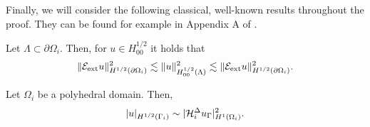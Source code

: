 Finally, we will consider the following classical, well-known results throughout the proof. They can be found for example in Appendix A of \cite{dd-book}.

\begin{lemma}
    Let $\Lambda \subset \partial\Omega_i$. Then, for $u \in H^{1/2}_{00}$ it holds that 
    \[\|\mathcal{E}_{\text{ext}}u\|^2_{H^{1/2}(\partial \Omega_i)} \lesssim \|u\|^2_{H^{1/2}_{00}(\Lambda)} \lesssim \|\mathcal{E}_{\text{ext}}u\|^2_{H^{1/2}(\partial\Omega_i)}.\]
\end{lemma}

\begin{theorem} Let $\Omega_i$ be a polyhedral domain. Then,
\[|u|_{H^{1/2}(\Gamma_i)} \sim |\mathcal{H}^{\Delta}_iu_{\Gamma}|^2_{H^1(\Omega_i)}.\]
    
\end{theorem}